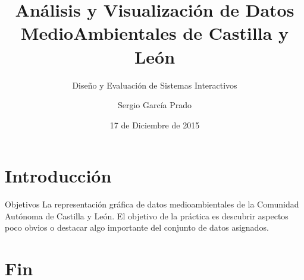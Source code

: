\documentclass{beamer}
\title[Análisis y Visualización de Datos MedioAmbientales de Castilla y León]{Análisis y Visualización de Datos MedioAmbientales de Castilla y León}
\subtitle[Diseño y Evaluación de Sistemas Interactivos]{Diseño y Evaluación de Sistemas Interactivos}
\author{Sergio García Prado\\}
\date{17 de Diciembre de 2015}
\begin{document}

	\begin{frame}
		\titlepage
	\end{frame}

	
	\begin{frame}
		\tableofcontents
	\end{frame}


	\section{Introducción}

		\begin{frame}{Objetivos}
 			La representación gráfica de datos medioambientales de la Comunidad Autónoma de Castilla y León. El objetivo de la práctica es descubrir aspectos poco obvios o destacar algo importante del conjunto de datos asignados.

		\end{frame}
\section{Fin}
\end{document}
